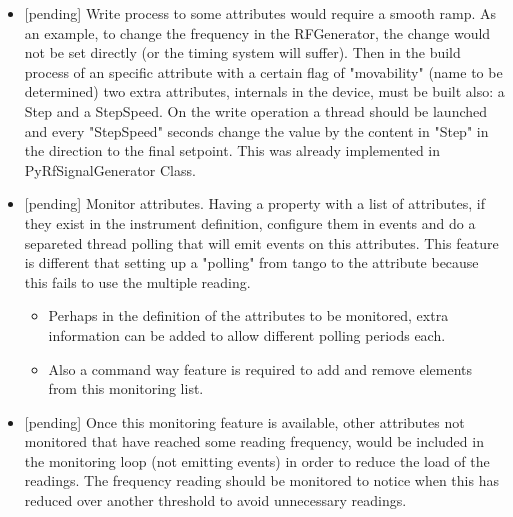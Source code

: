 \documentclass[a4paper,10pt]{article}
\begin{document}
\begin{itemize}
    \item {[\color{red}pending}] Write process to some attributes would require a smooth ramp. As an example, to change the frequency in the RFGenerator, the change would not be set directly (or the timing system will suffer). Then in the build process of an specific attribute with a certain flag of "movability" (name to be determined) two extra attributes, internals in the device, must be built also: a Step and a StepSpeed. On the write operation a thread should be launched and every "StepSpeed" seconds change the value by the content in "Step" in the direction to the final setpoint. This was already implemented in PyRfSignalGenerator Class.
    \item {[\color{red}pending}] Monitor attributes. Having a property with a list of attributes, if they exist in the instrument definition, configure them in events and do a separeted thread polling that will emit events on this attributes. This feature is different that setting up a "polling" from tango to the attribute because this fails to use the multiple reading.
    \begin{itemize}
        \item Perhaps in the definition of the attributes to be monitored, extra information can be added to allow different polling periods each.
        \item Also a command way feature is required to add and remove elements from this monitoring list.
    \end{itemize}
    \item {[\color{red}pending}] Once this monitoring feature is available, other attributes not monitored that have reached some reading frequency, would be included in the monitoring loop (not emitting events) in order to reduce the load of the readings. The frequency reading should be monitored to notice when this has reduced over another threshold to avoid unnecessary readings.
\end{itemize}
\end{document}
